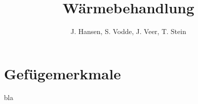 \documentclass[a4paper, 11pt, author=small]{tubsreprt}
\title{Wärmebehandlung}
\author{J. Hansen, S. Vodde,
 J. Veer, T. Stein}
\begin{document}
\maketitle[plain]
\tableofcontents

\chapter{Gefügemerkmale}
bla
\end{document}
